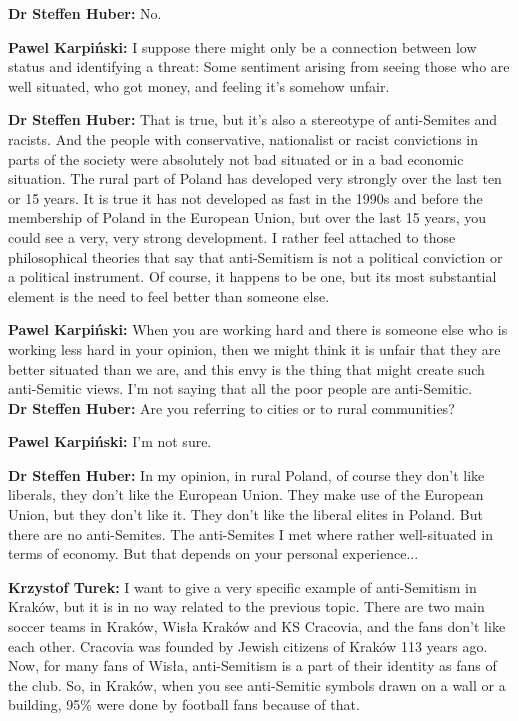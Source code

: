 \textbf{Dr Steffen Huber:} No.\par
\textbf{Pawel Karpiński:} I suppose there might only be a connection between low status and identifying a threat: Some sentiment arising from seeing those who are well situated, who got money, and feeling it's somehow unfair. \par  
\textbf{Dr Steffen Huber:} That is true, but it's also a stereotype of anti-Semites and racists. And the people with conservative, nationalist or racist convictions in parts of the society were absolutely not bad situated or in a bad economic situation. The rural part of Poland has developed very strongly over the last ten or 15 years. It is true it has not developed as fast in the 1990s and before the membership of Poland in the European Union, but over the last 15 years, you could see a very, very strong development. I rather feel attached to those philosophical theories that say that anti-Semitism is not a political conviction or a political instrument. Of course, it happens to be one, but its most substantial element is the need to feel better than someone else. \par 
\textbf{Pawel Karpiński:} When you are working hard and there is someone else who is working less hard in your opinion, then we might think it is unfair that they are better situated than we are, and this envy is the thing that might create such anti-Semitic views. I’m not saying that all the poor people are anti-Semitic.\\  
\textbf{Dr Steffen Huber:} Are you referring to cities or to rural communities? \par
\textbf{Pawel Karpiński:} I'm not sure.\par
\textbf{Dr Steffen Huber:} In my opinion, in rural Poland, of course they don't like liberals, they don't like the European Union. They make use of the European Union, but they don't like it. They don't like the liberal elites in Poland. But there are no anti-Semites. The anti-Semites I met where rather well-situated in terms of economy. But that depends on your personal experience...\par
\textbf{Krzystof Turek:} I want to give a very specific example of anti-Semitism in Kraków, but it is in no way related to the previous topic. There are two main soccer teams in Kraków, Wisła Kraków and KS Cracovia, and the fans don't like each other. Cracovia was founded by Jewish citizens of Kraków 113 years ago. Now, for many fans of Wisła, anti-Semitism is a part of their identity as fans of the club. So, in Kraków, when you see anti-Semitic symbols drawn on a wall or a building, 95\% were done by football fans because of that. 

